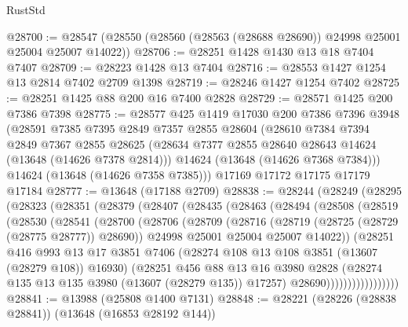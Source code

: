 \begin{lexlean}{RustStd}
\begin{coremodule}
@28700 := @28547 (@28550 (@28560 (@28563 (@28688 @28690)) @24998 @25001 @25004 @25007 @14022))
@28706 := @28251 @1428 @1430 @13 @18 @7404 @7407
@28709 := @28223 @1428 @13 @7404
@28716 := @28553 @1427 @1254 @13 @2814 @7402 @2709 @1398
@28719 := @28246 @1427 @1254 @7402
@28725 := @28251 @1425 @88 @200 @16 @7400 @2828
@28729 := @28571 @1425 @200 @7386 @7398
@28775 := @28577
    @425
    @1419
    @17030
    @200
    @7386
    @7396
    @3948
    (@28591
      @7385
      @7395
      @2849
      @7357
      @2855
      @28604
      (@28610
        @7384
        @7394
        @2849
        @7367
        @2855
        @28625
        (@28634 @7377 @2855 @28640 @28643 @14624 (@13648 (@14626 @7378 @2814)))
        @14624
        (@13648 (@14626 @7368 @7384)))
      @14624
      (@13648 (@14626 @7358 @7385)))
    @17169
    @17172
    @17175
    @17179
    @17184
@28777 := @13648 (@17188 @2709)
@28838 := @28244
    (@28249
      (@28295
        (@28323
          (@28351
            (@28379
              (@28407
                (@28435
                  (@28463
                    (@28494
                      (@28508
                        (@28519
                          (@28530
                            (@28541
                              (@28700
                                (@28706
                                  (@28709
                                    (@28716
                                      (@28719 (@28725 (@28729 (@28775 @28777)) @28690))
                                      @24998
                                      @25001
                                      @25004
                                      @25007
                                      @14022))
                                  (@28251
                                    @416
                                    @993
                                    @13
                                    @17
                                    @3851
                                    @7406
                                    (@28274 @108 @13 @108 @3851 (@13607 (@28279 @108)) @16930)
                                    (@28251
                                      @456
                                      @88
                                      @13
                                      @16
                                      @3980
                                      @2828
                                      (@28274 @135 @13 @135 @3980 (@13607 (@28279 @135)) @17257)
                                      @28690)))))))))))))))))
@28841 := @13988 (@25808 @1400 @7131)
@28848 := @28221 (@28226 (@28838 @28841)) (@13648 (@16853 @28192 @144))

\end{coremodule}
\end{lexlean}
